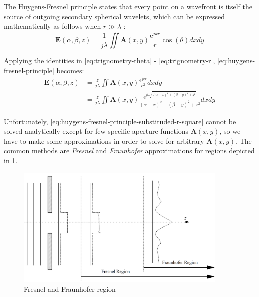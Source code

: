 The Huygens-Fresnel principle states that every point on a wavefront is itself the source of outgoing secondary spherical wavelets, which can be expressed mathematically as follows when $r\gg \lambda$ \cite{Goodman2017}:
\begin{equation}
  \textbf{E}(\alpha, \beta, z) = \frac{1}{j\lambda} \iint \textbf{A}(x,y)\frac{\mathrm{e}^{jkr}}{r} \cos(\theta) dxdy \label{eq:huygens-fresnel-principle}
\end{equation}

Applying the identities in \cref{eq:trignometry-theta} - \cref{eq:trignometry-r},  \cref{eq:huygens-fresnel-principle} becomes:
\begin{align}
  \textbf{E}(\alpha, \beta, z) & = \frac{z}{j\lambda} \iint \textbf{A}(x,y)\frac{\mathrm{e}^{jkr}}{r^2} dxdy                    \label{eq:huygens-fresnel-principle-substituded-cos}                                                      \\
                      & = \frac{z}{j\lambda} \iint \textbf{A}(x,y)\frac{\mathrm{e}^{jk\sqrt{(\alpha-x)^2 + (\beta-y)^2 + z^2}}}{(\alpha-x)^2 + (\beta-y)^2 + z^2} dxdy \label{eq:huygens-fresnel-principle-substituded-r-square}
\end{align}

Unfortunately, \cref{eq:huygens-fresnel-principle-substituded-r-square} cannot be solved analytically except for few specific aperture functions $\textbf{A}(x,y)$, so we have to make some approximations in order to solve for arbitrary $\textbf{A}(x,y)$. The common methods are \textit{Fresnel} and \textit{Fraunhofer} approximations for regions depicted in \cref{fig:fresnel_fraunhofer_approximations}.

\begin{figure}[H]
  \centering
  \includegraphics[width=0.9\textwidth]{fresnel_fraunhofer_approximations.png}
  \caption{Fresnel and Fraunhofer region \cite{Wilkinson2019}}\label{fig:fresnel_fraunhofer_approximations}
\end{figure}


